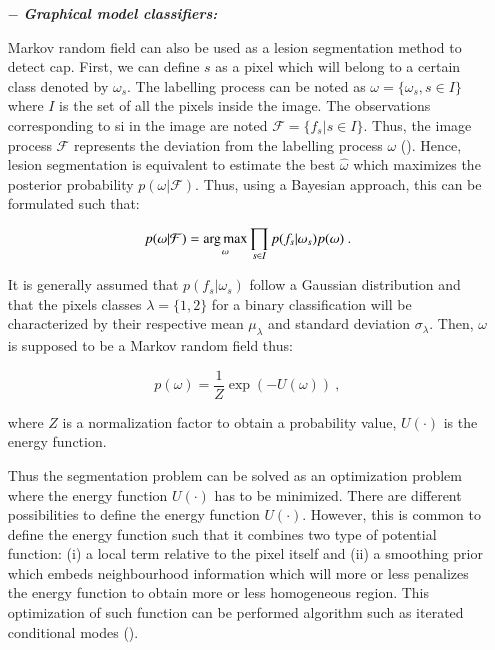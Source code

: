 \begin{enumerate}[leftmargin=*]
\item[$-$] \textbf{\textit{Graphical model classifiers:}}

Markov random field can also be used as a lesion segmentation method to detect \ac{cap}. First, we can define $s$ as a pixel which will belong to a certain class denoted by $\omega_s$. The labelling process can be noted as $\omega = \{\omega_s, s \in I\}$ where $I$ is the set of all the pixels inside the image. The observations corresponding to \ac{si} in the image are noted $\mathcal{F} = \{ f_s | s \in I \}$. Thus, the image process $\mathcal{F}$ represents the deviation from the labelling process $\omega$ (\cite{Kato2001}). Hence, lesion segmentation is equivalent to estimate the best $\hat{\omega}$ which maximizes the posterior probability $p(\omega|\mathcal{F})$. Thus, using a Bayesian approach, this can be formulated such that:

\begin{equation}
	p(\omega|\mathcal{F}) = \operatorname*{arg\,max}_{\omega} \prod_{s \in I} p(f_s | \omega_s) p(\omega) \ .
	\label{eq:mrf1}
\end{equation}

It is generally assumed that $p(f_s | \omega_s)$ follow a Gaussian distribution and that the pixels classes $\lambda = \{1,2\}$ for a binary classification will be characterized by their respective mean $\mu_{\lambda}$ and standard deviation $\sigma_{\lambda}$. Then, $\omega$ is supposed to be a Markov random field thus:

\begin{equation}
	p(\omega) =  \frac{1}{Z} \exp\left( -U(\omega) \right)  \ ,
	\label{eq:mrf2}
\end{equation}

\noindent where $Z$ is a normalization factor to obtain a probability value, $U(\cdot)$ is the energy function.

Thus the segmentation problem can be solved as an optimization problem where the energy function $U(\cdot)$ has to be minimized. There are different possibilities to define the energy function $U(\cdot)$. However, this is common to define the energy function such that it combines two type of potential function: (i) a local term relative to the pixel itself and (ii) a smoothing prior which embeds neighbourhood information which will more or less penalizes the energy function to obtain more or less homogeneous region. This optimization of such function can be performed algorithm such as iterated conditional modes (\cite{Kato2001}).


\end{enumerate}

